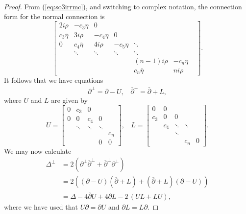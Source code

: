 \documentclass[10pt,a4paper]{amsart}
\begin{document}
\begin{proof}
    From (\ref{eq:so3irrmc}), and switching to complex notation, the connection form for the normal connection is
    \begin{equation*}
        \begin{bmatrix}
           2 i \rho & - c_3 \eta & 0 & & & & \\
            c_3 \overline{\eta} & 3 i \rho & - c_4 \eta & 0 & & & \\
            0 & c_4 \overline{\eta} & 4 i \rho  & -c_5 \eta & \ddots  & &  \\
             & \ddots & \ddots & \ddots & \ddots & & \\
             & & & & (n-1)i \rho & -c_n {\eta} \\
             & & & & c_n \overline{\eta} & n i \rho
        \end{bmatrix}.
    \end{equation*}
    It follows that we have equations
    \begin{equation*}
        \partial^{\perp} = \partial - U, \:\:\:\: \overline{\partial}^\perp = \overline{\partial} + L,
    \end{equation*}
    where $U$ and $L$ are given by
    \begin{equation*}
        U = \begin{bmatrix}
            0 & c_3 & 0 & & \\
            0 & 0 & c_4 & 0 & \\
             & \ddots & \ddots & \ddots & \\
             & & & & c_n \\
             & & & 0 & 0
        \end{bmatrix}, \:\:\:\: L = \begin{bmatrix}
            0 & 0 &  & & \\
            c_3 & 0 & 0 &  & \\
             & c_4 & \ddots & \ddots & \\
             & & \ddots & & \\
             & & & c_n & 0
        \end{bmatrix}.
    \end{equation*} 
We may now calculate
    \begin{align*}
        \Delta^\perp & = 2 \left( \partial^\perp \overline{\partial}^\perp + \overline{\partial}^\perp \partial^\perp \right) \\
        & = 2 \left( (\partial - U)(\overline{\partial} + L) + (\overline{\partial} + L)(\partial - U)  \right) \\
        & = \Delta - 4  \overline{\partial}U + 4  \partial L - 2 \, (UL + LU),
    \end{align*}
where we have used that $U\overline{\partial} = \overline{\partial} U$ and $\partial L = L \partial$.
\end{proof}
\end{document}
